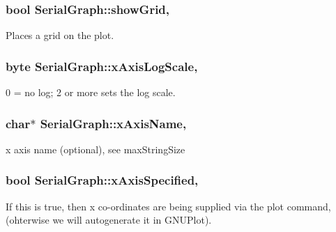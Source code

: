 \subsubsection[{show\+Grid}]{\setlength{\rightskip}{0pt plus 5cm}bool Serial\+Graph\+::show\+Grid\hspace{0.3cm}{\ttfamily [protected]}, {\ttfamily [inherited]}}\label{class_serial_graph_ad61d5ea29eacc1611c5addc94714f1e2}
Places a grid on the plot. \hypertarget{class_serial_graph_afc2ca72fdfe2bc5e3159c9e910a8f81e}{}
\subsubsection[{x\+Axis\+Log\+Scale}]{\setlength{\rightskip}{0pt plus 5cm}byte Serial\+Graph\+::x\+Axis\+Log\+Scale\hspace{0.3cm}{\ttfamily [protected]}, {\ttfamily [inherited]}}\label{class_serial_graph_afc2ca72fdfe2bc5e3159c9e910a8f81e}
0 = no log; 2 or more sets the log scale. \hypertarget{class_serial_graph_a5f5bf85ed361ff567d0888eaa73e269c}{}
\subsubsection[{x\+Axis\+Name}]{\setlength{\rightskip}{0pt plus 5cm}char$\ast$ Serial\+Graph\+::x\+Axis\+Name\hspace{0.3cm}{\ttfamily [protected]}, {\ttfamily [inherited]}}\label{class_serial_graph_a5f5bf85ed361ff567d0888eaa73e269c}
x axis name (optional), see max\+String\+Size \hypertarget{class_serial_graph_a4dbd9cf190c591fb4f2f46a50d937199}{}
\subsubsection[{x\+Axis\+Specified}]{\setlength{\rightskip}{0pt plus 5cm}bool Serial\+Graph\+::x\+Axis\+Specified\hspace{0.3cm}{\ttfamily [protected]}, {\ttfamily [inherited]}}\label{class_serial_graph_a4dbd9cf190c591fb4f2f46a50d937199}
If this is true, then x co-\/ordinates are being supplied via the plot command, (ohterwise we will autogenerate it in G\+N\+U\+Plot). \hypertarget{class_serial_graph_a1f0424857ec14c176747b3ddb0768eee}{}
